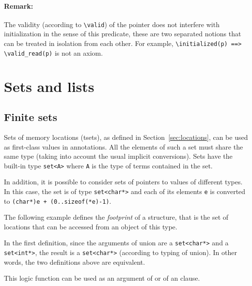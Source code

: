 \paragraph{Remark:} The validity (according to \lstinline|\valid|) of the pointer
does not interfere with initialization in the sense of this predicate, these are
two separated notions that can be treated in isolation from each other. For
example, \lstinline|\initialized(p) ==> \valid_read(p)| is not an axiom.

\section{Sets and lists}


\subsection{Finite sets}\label{sec:sets}
Sets of memory locations (tsets), as defined in Section~\ref{sec:locations},
can be used as first-class values in
annotations. All the elements of such a set must share the same type
(taking into account the usual implicit conversions).
Sets have the built-in type \lstinline|set<A>|
where \lstinline|A| is the type of terms contained in the set.

In addition, it is possible to consider sets of pointers to values of
different types. In this case, the set is of type
\lstinline|set<char*>| and
each of its elements \lstinline|e| is converted to
\lstinline|(char*)e + (0..sizeof(*e)-1)|.

\begin{example}
  The following example defines the \emph{footprint} of a
  structure, that is the set of locations that can be accessed from an
  object of this type.


  In the first definition, since the arguments of union are a
  \lstinline|set<char*>| and a \lstinline|set<int*>|,
  the result is a \lstinline|set<char*>| (according to typing of union). In
  other words, the two definitions above are equivalent.

  This logic function can be used as an argument of \separated or of an
  \assigns clause.
\end{example}

